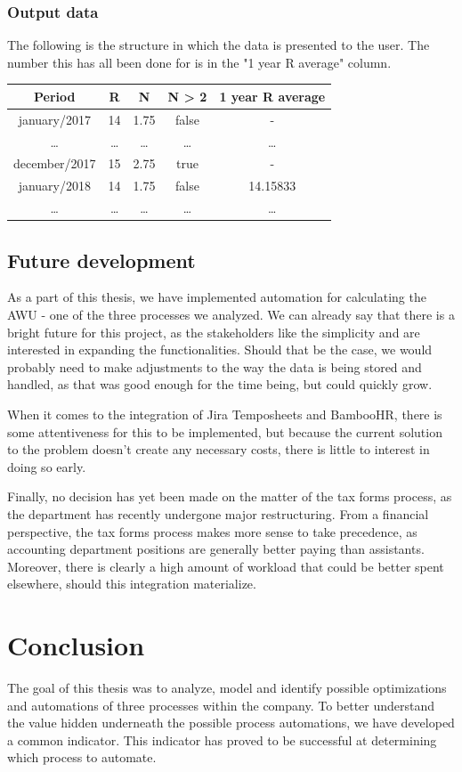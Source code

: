 \documentclass[12pt,oneside]{fithesis2}
\begin{document}
\subsection{Output data}
The following is the structure in which the data is presented to the user. The number this has all been done for is in the "1 year R average" column.
\begin{center}
\begin{tabular}{ |c|c|c|c|c| } 
\hline
Period & R & N & N > 2 & 1 year R average \\
\hline
january/2017 & 14 & 1.75 & false & - \\
\dots & \dots & \dots & \dots & \dots \\
december/2017 & 15 & 2.75 & true & - \\
january/2018 & 14 & 1.75 & false & 14.15833 \\
\dots & \dots & \dots & \dots & \dots \\
\hline
\end{tabular}
\end{center}
\section{Future development}
As a part of this thesis, we have implemented automation for calculating the AWU - one of the three processes we analyzed. We can already say that there is a bright future for this project, as the stakeholders like the simplicity and are interested in expanding the functionalities. Should that be the case, we would probably need to make adjustments to the way the data is being stored and handled, as that was good enough for the time being, but could quickly grow.

When it comes to the integration of Jira Temposheets and BambooHR, there is some attentiveness for this to be implemented, but because the current solution to the problem doesn't create any necessary costs, there is little to interest in doing so early.

Finally, no decision has yet been made on the matter of the tax forms process, as the department has recently undergone major restructuring. From a financial perspective, the tax forms process makes more sense to take precedence, as accounting department positions are generally better paying than assistants. Moreover, there is clearly a high amount of workload that could be better spent elsewhere, should this integration materialize.
\chapter{Conclusion}
The goal of this thesis was to analyze, model and identify possible optimizations and automations of three processes within the company. To better understand the value hidden underneath the possible process automations, we have developed a common indicator. This indicator has proved to be successful at determining which process to automate.
\end{document}
